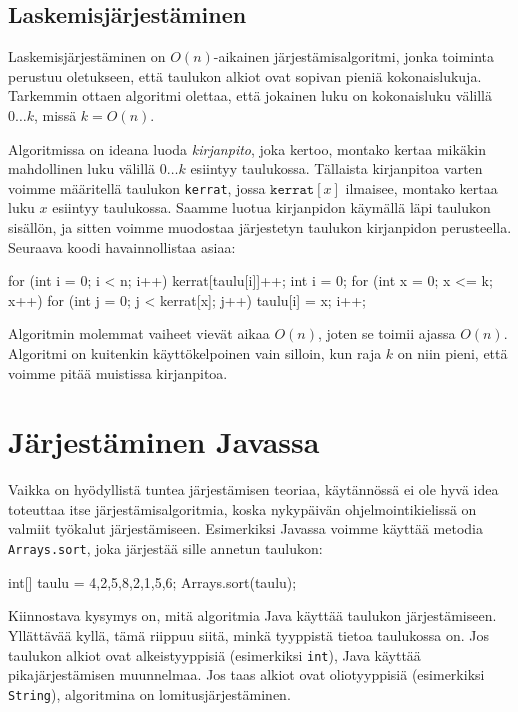\subsection{Laskemisjärjestäminen}

Laskemisjärjestäminen on $O(n)$-aikainen järjestämisalgoritmi,
jonka toiminta perustuu oletukseen, että taulukon alkiot
ovat sopivan pieniä kokonaislukuja.
Tarkemmin ottaen algoritmi olettaa, että jokainen luku on
kokonaisluku välillä $0 \dots k$, missä $k=O(n)$.

Algoritmissa on ideana luoda \emph{kirjanpito}, joka kertoo,
montako kertaa mikäkin mahdollinen luku välillä $0 \dots k$
esiintyy taulukossa.
Tällaista kirjanpitoa varten voimme määritellä taulukon
\texttt{kerrat}, jossa $\texttt{kerrat}[x]$ ilmaisee,
montako kertaa luku $x$ esiintyy taulukossa.
Saamme luotua kirjanpidon käymällä läpi taulukon sisällön,
ja sitten voimme muodostaa järjestetyn taulukon
kirjanpidon perusteella.
Seuraava koodi havainnollistaa asiaa:

\begin{code}
for (int i = 0; i < n; i++) {
    kerrat[taulu[i]]++;
}
int i = 0;
for (int x = 0; x <= k; x++) {
    for (int j = 0; j < kerrat[x]; j++) {
        taulu[i] = x;
        i++;
    }
}
\end{code}

Algoritmin molemmat vaiheet vievät aikaa $O(n)$,
joten se toimii ajassa $O(n)$.
Algoritmi on kuitenkin käyttökelpoinen vain silloin,
kun raja $k$ on niin pieni, että voimme pitää
muistissa kirjanpitoa.

\section{Järjestäminen Javassa}

Vaikka on hyödyllistä tuntea järjestämisen teoriaa,
käytännössä ei ole hyvä idea toteuttaa itse
järjestämisalgoritmia, koska nykypäivän ohjelmointikielissä
on valmiit työkalut järjestämiseen.
Esimerkiksi Javassa voimme käyttää metodia \texttt{Arrays.sort},
joka järjestää sille annetun taulukon:

\begin{code}
int[] taulu = {4,2,5,8,2,1,5,6};
Arrays.sort(taulu);
\end{code}

Kiinnostava kysymys on, mitä algoritmia Java käyttää
taulukon järjes\-tämiseen.
Yllättävää kyllä, tämä riippuu siitä, minkä tyyppistä tietoa
taulukossa on.
Jos taulukon alkiot ovat alkeistyyppisiä
(esimerkiksi \texttt{int}), Java käyttää 
pikajärjestämisen muunnelmaa.
Jos taas alkiot ovat oliotyyppisiä
(esimerkiksi \texttt{String}),
algoritmina on lomitusjärjestäminen.

